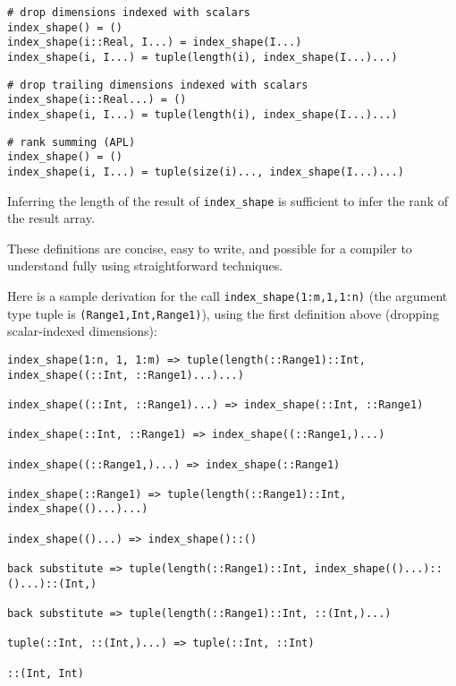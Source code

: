 
\begin{verbatim}
# drop dimensions indexed with scalars
index_shape() = ()
index_shape(i::Real, I...) = index_shape(I...)
index_shape(i, I...) = tuple(length(i), index_shape(I...)...)
\end{verbatim}

\begin{verbatim}
# drop trailing dimensions indexed with scalars
index_shape(i::Real...) = ()
index_shape(i, I...) = tuple(length(i), index_shape(I...)...)
\end{verbatim}

\begin{verbatim}
# rank summing (APL)
index_shape() = ()
index_shape(i, I...) = tuple(size(i)..., index_shape(I...)...)
\end{verbatim}

Inferring the length of the result of \texttt{index\_shape} is sufficient
to infer the rank of the result array.

These definitions are concise, easy to write, and possible for a
compiler to understand fully using straightforward techniques.


Here is a sample derivation for the call \texttt{index\_shape(1:m,1,1:n)}
(the argument type tuple is \texttt{(Range1,Int,Range1)}), using the first
definition above (dropping scalar-indexed dimensions):

\begin{verbatim}
index_shape(1:n, 1, 1:m) => tuple(length(::Range1)::Int, index_shape((::Int, ::Range1)...)...)

index_shape((::Int, ::Range1)...) => index_shape(::Int, ::Range1)

index_shape(::Int, ::Range1) => index_shape((::Range1,)...)

index_shape((::Range1,)...) => index_shape(::Range1)

index_shape(::Range1) => tuple(length(::Range1)::Int, index_shape(()...)...)

index_shape(()...) => index_shape()::()

back substitute => tuple(length(::Range1)::Int, index_shape(()...)::()...)::(Int,)

back substitute => tuple(length(::Range1)::Int, ::(Int,)...)

tuple(::Int, ::(Int,)...) => tuple(::Int, ::Int)

::(Int, Int)

\end{verbatim}

